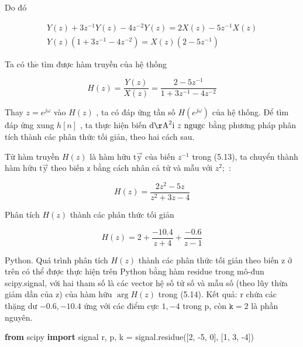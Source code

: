 \documentclass[
  10
]{article}
\newenvironment{Shaded}{}{}
\newcommand{\DecValTok}[1]{\textcolor[rgb]{0.25,0.63,0.44}{#1}}
\newcommand{\ImportTok}[1]{\textcolor[rgb]{0.00,0.50,0.00}{\textbf{#1}}}
\newcommand{\NormalTok}[1]{#1}
\newcommand{\OperatorTok}[1]{\textcolor[rgb]{0.40,0.40,0.40}{#1}}
\begin{document}
Do đó

\[
\begin{array}{r} Y (z) + 3 z ^ {- 1} Y (z) - 4 z ^ {- 2} Y (z) = 2 X (z) - 5 z ^ {- 1} X (z) \\ Y (z) (1 + 3 z ^ {- 1} - 4 z ^ {- 2}) = X (z) (2 - 5 z ^ {- 1}) \end{array}
\]

Ta có \(\mathrm { t h } \mathring { \mathrm { e } }\) tìm được hàm
truyền của hệ thống

\[
H (z) = \frac {Y (z)}{X (z)} = \frac {2 - 5 z ^ {- 1}}{1 + 3 z ^ {- 1} - 4 z ^ {- 2}}\tag{5.13}
\]

Thay \(z = e ^ { j \omega }\) vào \(H ( z )\) , ta có đáp ứng tần số
\(H ( e ^ { j \omega } )\) của hệ thống. Để tìm đáp ứng xung \(h [ n ]\)
, ta thực hiện biến
\(\mathrm { d } \mathrm { \AA } ^ { 2 } \mathrm { i } \ z \ \mathrm { n g u g c }\)
bằng phương pháp phân tích thành các phân thức tối giản, theo hai cách
sau.

Từ hàm truyền \(H ( z )\) là hàm hữu \(\mathrm { t \vec { y } }\) của
biến \(z ^ { - 1 }\) trong (5.13), ta chuyển thành hàm hữu
\(\mathrm { t \vec { y } }\) theo biến z bằng cách nhân cả tử và mẫu với
\(z ^ { 2 } ;\) :

\[
H (z) = \frac {2 z ^ {2} - 5 z}{z ^ {2} + 3 z - 4}\tag{5.14}
\]

Phân tích \(H ( z )\) thành các phân thức tối giản

\[
H (z) = 2 + \frac {- 1 0 . 4}{z + 4} + \frac {- 0 . 6}{z - 1}
\]

Python. Quá trình phân tích \(H ( z )\) thành các phân thức tối giản
theo biến z ở trên có thể được thực hiện trên Python bằng hàm residue
trong mô-đun scipy.signal, với hai tham số là các vector hệ số tử số và
mẫu số (theo lũy thừa giảm dần của z) của hàm hữu \(\arg H ( z )\) trong
(5.14). Kết quả: r chứa các thặng dư \(- 0 . 6 , - 1 0 . 4\) ứng với các
điểm cực \(1 , - 4\) trong p, còn \(\mathtt { k } = 2\) là phần nguyên.

\begin{Shaded}
\begin{Highlighting}[]
\ImportTok{from}\NormalTok{ scipy }\ImportTok{import}\NormalTok{ signal}
\NormalTok{r, p, k }\OperatorTok{=}\NormalTok{ signal.residue([}\DecValTok{2}\NormalTok{, }\OperatorTok{{-}}\DecValTok{5}\NormalTok{, }\DecValTok{0}\NormalTok{], [}\DecValTok{1}\NormalTok{, }\DecValTok{3}\NormalTok{, }\OperatorTok{{-}}\DecValTok{4}\NormalTok{]) }
\end{Highlighting}
\end{Shaded}
\end{document}
